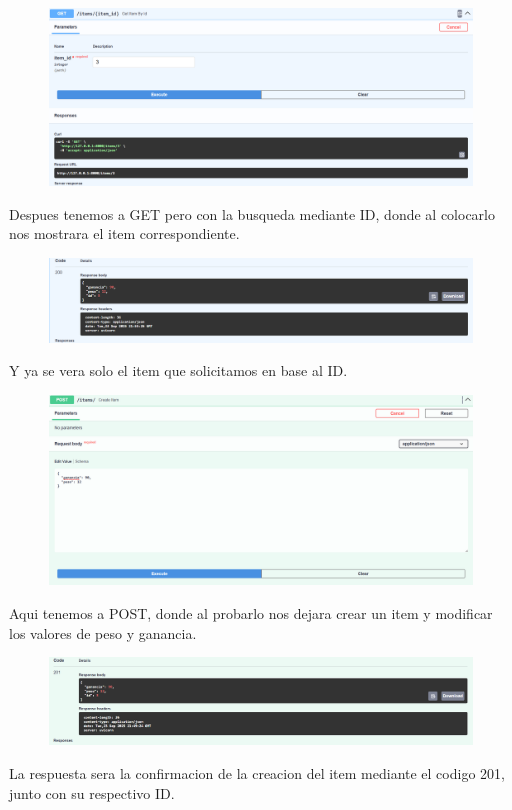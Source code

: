 \documentclass[12pt]{article}
\begin{document}
\begin{figure}[H]
    \centering
    \includegraphics[width=1\textwidth]{Imagenes/GETID1.png}
\end{figure}
Despues tenemos a GET pero con la busqueda mediante ID, donde al colocarlo nos mostrara el item correspondiente.

\begin{figure}[H]
    \centering
    \includegraphics[width=1\textwidth]{Imagenes/GETID2.png}
\end{figure}
Y ya se vera solo el item que solicitamos en base al ID.

\begin{figure}[H]
    \centering
    \includegraphics[width=1\textwidth]{Imagenes/POST1.png}
\end{figure}
Aqui tenemos a POST, donde al probarlo nos dejara crear un item y modificar los valores de peso y ganancia.

\begin{figure}[H]
    \centering
    \includegraphics[width=1\textwidth]{Imagenes/POST2.png}
\end{figure}
La respuesta sera la confirmacion de la creacion del item mediante el codigo 201, junto con su respectivo ID.
\end{document}
